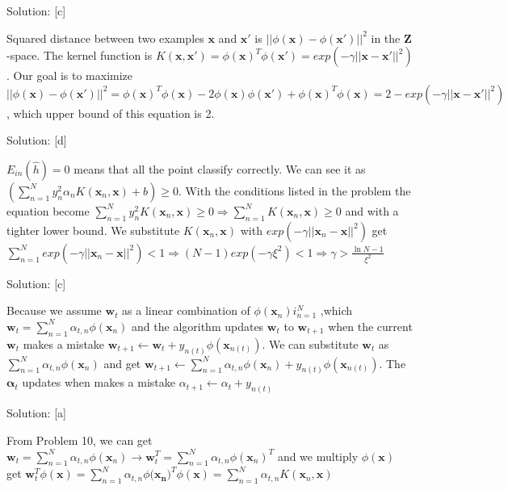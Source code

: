 \documentclass{../../Latex_Template/Homework/homework}
\begin{document}
\question
Solution: [c]

Squared distance between two examples $\mathbf{x}$ and $\mathbf{x'}$ is
$||\phi(\mathbf{x}) - \phi(\mathbf{x'})||^{2}$ in the $\mathbf{Z}$-space. The
kernel function is $K(\mathbf{x}, \mathbf{x'}) = \phi(\mathbf{x})^{T}
\phi(\mathbf{x'}) = exp(- \gamma ||\mathbf{x} - \mathbf{x'}||^{2})$. Our goal is
to maximize $||\phi(\mathbf{x}) - \phi(\mathbf{x'})||^{2} = \phi(\mathbf{x})^{T}
\phi(\mathbf{x}) - 2\phi(\mathbf{x})\phi(\mathbf{x'}) + \phi(\mathbf{x})^{T}
\phi(\mathbf{x}) = 2 - exp(- \gamma ||\mathbf{x} - \mathbf{x'}||^{2})$, which
upper bound of this equation is 2.


\question
Solution: [d]

$E_{in}(\hat{h}) = 0$ means that all the point classify correctly. We can see
it as $\left( \sum_{n = 1}^{N} y_{n}^{2} \alpha_{n} K(\mathbf{x}_{n},
\mathbf{x}) + b \right) \geq 0$. With the conditions listed in the problem the
equation become $\sum_{n = 1}^{N} y_{n}^{2} K(\mathbf{x}_{n}, \mathbf{x}) \geq
 0 \Rightarrow \sum_{n = 1}^{N} K(\mathbf{x}_{n}, \mathbf{x}) \geq 0$ and with
a tighter lower bound. We substitute $K(\mathbf{x}_{n}, \mathbf{x})$ with
$exp(- \gamma ||\mathbf{x}_{n} - \mathbf{x}||^{2})$ get $\sum_{n = 1}^{N} exp(
- \gamma ||\mathbf{x}_{n} - \mathbf{x}||^{2}) < 1 \Rightarrow (N - 1) exp( -
\gamma \xi^{2}) < 1 \Rightarrow \gamma > \frac{\ln{N - 1}}{\xi^{2}}$


\question
Solution: [c]

Because we assume $\mathbf{w}_{t}$ as a linear combination of ${\phi(
\mathbf{x}_{n})}i_{n = 1}^{N}$ ,which $\mathbf{w}_{t} = \sum_{n = 1}^{N}
\alpha_{t, n} \phi(\mathbf{x}_{n})$ and the algorithm updates $\mathbf{w}_{t}$
to $\mathbf{w}_{t+1}$ when the current $\mathbf{w}_{t}$ makes a mistake
$\mathbf{w}_{t+1} \leftarrow \mathbf{w}_{t} + y_{n(t)} \phi(\mathbf{x}_{n(t)})$.
We can substitute $\mathbf{w}_{t}$ as $\sum_{n = 1}^{N} \alpha_{t, n}
\phi(\mathbf{x}_{n})$ and get $\mathbf{w}_{t+1} \leftarrow \sum_{n = 1}^{N}
\alpha_{t, n} \phi(\mathbf{x}_{n}) + y_{n(t)} \phi(\mathbf{x}_{n(t)})$. The
$\mathbf{\alpha}_{t}$ updates when makes a mistake $\alpha_{t+1} \leftarrow 
\alpha_{t} + y_{n(t)}$


\question
Solution: [a]

From Problem 10, we can get $\mathbf{w}_{t} = \sum_{n = 1}^{N} \alpha_{t, n}
\phi(\mathbf{x}_{n}) \rightarrow \mathbf{w}_{t}^{T} = \sum_{n = 1}^{N}
\alpha_{t, n} \phi(\mathbf{x}_{n})^{T}$ and we multiply $\phi(\mathbf{x})$ get
$\mathbf{w}_{t}^{T} \phi(\mathbf{x}) = \sum_{n = 1}^{N} \alpha_{t, n}
\phi(\mathbf{x_{n})}^{T} \phi(\mathbf{x}) = \sum_{n = 1}^{N} \alpha_{t, n}
K(\mathbf{x}_{n}, \mathbf{x})$
\end{document}
